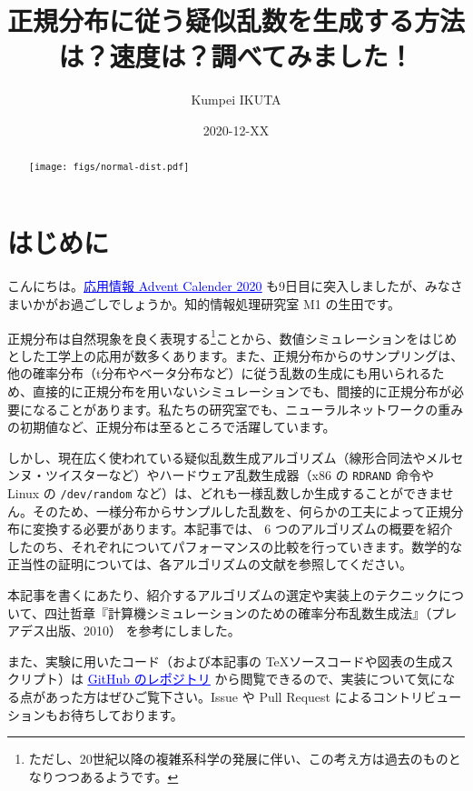 \documentclass[twocolumn, dvipdfmx]{jsarticle}
\begin{document}
\title{正規分布に従う疑似乱数を生成する方法は？速度は？調べてみました！}
\author{Kumpei IKUTA}
\date{2020-12-XX}

\renewcommand{\abstractname}{}
\begin{abstract}
\centering
\texttt{[image: figs/normal-dist.pdf]}
\end{abstract}

\maketitle

\section*{はじめに}

こんにちは。\href{https://adventar.org/calendars/5671}{\textcolor{blue}{\underline{応用情報 Advent Calender 2020}}} も9日目に突入しましたが、みなさまいかがお過ごしでしょうか。知的情報処理研究室 M1 の生田です。

正規分布は自然現象を良く表現する\footnote{ただし、20世紀以降の複雑系科学の発展に伴い、この考え方は過去のものとなりつつあるようです。}ことから、数値シミュレーションをはじめとした工学上の応用が数多くあります。また、正規分布からのサンプリングは、他の確率分布（t分布やベータ分布など）に従う乱数の生成にも用いられるため、直接的に正規分布を用いないシミュレーションでも、間接的に正規分布が必要になることがあります。私たちの研究室でも、ニューラルネットワークの重みの初期値など、正規分布は至るところで活躍しています。

しかし、現在広く使われている疑似乱数生成アルゴリズム（線形合同法やメルセンヌ・ツイスターなど）やハードウェア乱数生成器（x86 の \texttt{RDRAND} 命令や Linux の \texttt{/dev/random} など）は、どれも一様乱数しか生成することができません。そのため、一様分布からサンプルした乱数を、何らかの工夫によって正規分布に変換する必要があります。本記事では、 6 つのアルゴリズムの概要を紹介したのち、それぞれについてパフォーマンスの比較を行っていきます。数学的な正当性の証明については、各アルゴリズムの文献を参照してください。

本記事を書くにあたり、紹介するアルゴリズムの選定や実装上のテクニックについて、四辻哲章『計算機シミュレーションのための確率分布乱数生成法』（プレアデス出版、2010）\cite{yotsuji2010} を参考にしました。

また、実験に用いたコード（および本記事の \TeX ソースコードや図表の生成スクリプト）は \href{https://github.com/ikr7/benchmark-normal-variates}{\textcolor{blue}{\underline{GitHub のレポジトリ}}} から閲覧できるので、実装について気になる点があった方はぜひご覧下さい。Issue や Pull Request によるコントリビューションもお待ちしております。
\end{document}
